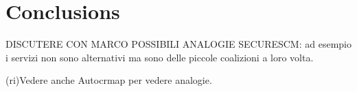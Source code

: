 \documentclass[10pt,journal,compsoc]{IEEEtran}
\theoremstyle{definition}
\begin{document}
\section{Conclusions}
DISCUTERE CON MARCO POSSIBILI ANALOGIE SECURESCM: ad esempio i servizi non sono alternativi ma sono delle piccole coalizioni a loro volta.

(ri)Vedere anche Autocrmap per vedere analogie.



\end{document}
